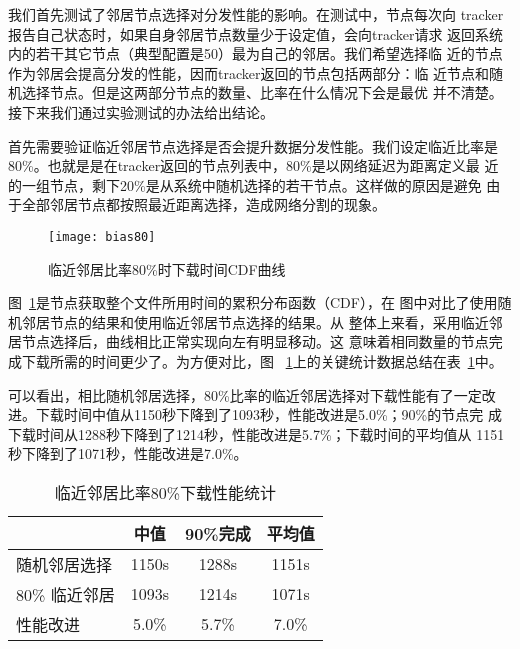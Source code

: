 我们首先测试了邻居节点选择对分发性能的影响。在测试中，节点每次向
tracker报告自己状态时，如果自身邻居节点数量少于设定值，会向tracker请求
返回系统内的若干其它节点（典型配置是50）最为自己的邻居。我们希望选择临
近的节点作为邻居会提高分发的性能，因而tracker返回的节点包括两部分：临
近节点和随机选择节点。但是这两部分节点的数量、比率在什么情况下会是最优
并不清楚。接下来我们通过实验测试的办法给出结论。

首先需要验证临近邻居节点选择是否会提升数据分发性能。我们设定临近比率是
80\%。也就是是在tracker返回的节点列表中，80\%是以网络延迟为距离定义最
近的一组节点，剩下20\%是从系统中随机选择的若干节点。这样做的原因是避免
由于全部邻居节点都按照最近距离选择，造成网络分割的现象。

\begin{figure}
  \centering
  \begin{minipage}{0.6\linewidth}
    \centering
    \texttt{[image: bias80]}
    \caption{临近邻居比率80\%时下载时间CDF曲线}
    \label{fig:bias80}
  \end{minipage}
\end{figure}

图~\ref{fig:bias80}是节点获取整个文件所用时间的累积分布函数（CDF），在
图中对比了使用随机邻居节点的结果和使用临近邻居节点选择的结果。从
整体上来看，采用临近邻居节点选择后，曲线相比正常实现向左有明显移动。这
意味着相同数量的节点完成下载所需的时间更少了。为方便对比，图~
\ref{fig:bias80}上的关键统计数据总结在表~\ref{tbl:bias80}中。

可以看出，相比随机邻居选择，80\%比率的临近邻居选择对下载性能有了一定改
进。下载时间中值从1150秒下降到了1093秒，性能改进是5.0\%；90\%的节点完
成下载时间从1288秒下降到了1214秒，性能改进是5.7\%；下载时间的平均值从
1151秒下降到了1071秒，性能改进是7.0\%。

\begin{table}
\centering
\begin{minipage}{0.6\linewidth}
\centering
\caption{临近邻居比率80\%下载性能统计}
\label{tbl:bias80}
\begin{tabular}{lccc}

\toprule[1.5pt]
    & 中值 & 90\%完成 & 平均值\\
\midrule[1pt]
随机邻居选择  & 1150s & 1288s & 1151s\\
80\% 临近邻居 & 1093s & 1214s & 1071s\\
性能改进      & 5.0\% & 5.7\% & 7.0\%\\
\bottomrule[1.5pt]
\end{tabular}
\end{minipage}
\end{table}


